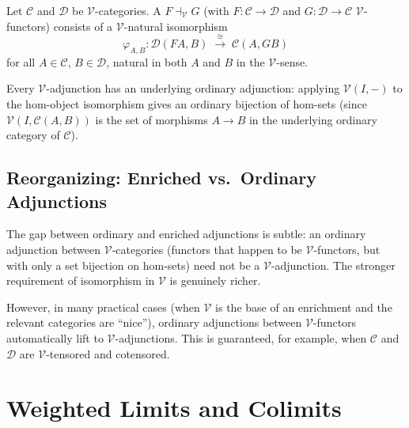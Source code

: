 \begin{definition}
Let $\mathcal{C}$ and $\mathcal{D}$ be $\mathcal{V}$-categories. A
 $F \dashv_\mathcal{V} G$ (with
$F : \mathcal{C} \to \mathcal{D}$ and $G : \mathcal{D} \to \mathcal{C}$
$\mathcal{V}$-functors) consists of a $\mathcal{V}$-natural isomorphism
\begin{equation*}
  \varphi_{A,B} : \mathcal{D}(FA, B) \;\xrightarrow{\;\cong\;}\; \mathcal{C}(A, GB)
\end{equation*}
for all $A \in \mathcal{C}$, $B \in \mathcal{D}$, natural in both $A$ and $B$
in the $\mathcal{V}$-sense.
\end{definition}

\begin{remark}
Every $\mathcal{V}$-adjunction has an underlying ordinary adjunction: applying
$\mathcal{V}(I, -)$ to the hom-object isomorphism gives an ordinary bijection
of hom-sets (since $\mathcal{V}(I, \mathcal{C}(A,B))$ is the set of morphisms
$A \to B$ in the underlying ordinary category of $\mathcal{C}$).
\end{remark}

\subsection{Reorganizing: Enriched vs.\ Ordinary Adjunctions}

The gap between ordinary and enriched adjunctions is subtle: an ordinary
adjunction between $\mathcal{V}$-categories (functors that happen to be
$\mathcal{V}$-functors, but with only a set bijection on hom-sets) need not
be a $\mathcal{V}$-adjunction. The stronger requirement of isomorphism in
$\mathcal{V}$ is genuinely richer.

However, in many practical cases (when $\mathcal{V}$ is the base of an enrichment
and the relevant categories are ``nice''), ordinary adjunctions between
$\mathcal{V}$-functors automatically lift to $\mathcal{V}$-adjunctions. This
is guaranteed, for example, when $\mathcal{C}$ and $\mathcal{D}$ are
$\mathcal{V}$-tensored and cotensored.


\section{Weighted Limits and Colimits}
\label{sec:weighted-limits}

